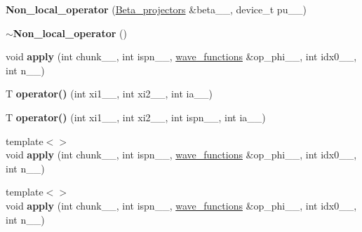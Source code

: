 \begin{DoxyCompactItemize}
\item 
\hypertarget{classsirius_1_1_non__local__operator_a67d6017cacb1ae150bb4e6275829b378}{}{\bfseries Non\+\_\+local\+\_\+operator} (\hyperlink{classsirius_1_1_beta__projectors}{Beta\+\_\+projectors} \&beta\+\_\+\+\_\+, device\+\_\+t pu\+\_\+\+\_\+)\label{classsirius_1_1_non__local__operator_a67d6017cacb1ae150bb4e6275829b378}

\item 
\hypertarget{classsirius_1_1_non__local__operator_a5475aa73a463143ff8c5e8a3ef864924}{}{\bfseries $\sim$\+Non\+\_\+local\+\_\+operator} ()\label{classsirius_1_1_non__local__operator_a5475aa73a463143ff8c5e8a3ef864924}

\item 
\hypertarget{classsirius_1_1_non__local__operator_a64d7b05b71fd42d0689b126756728286}{}void {\bfseries apply} (int chunk\+\_\+\+\_\+, int ispn\+\_\+\+\_\+, \hyperlink{classsddk_1_1wave__functions}{wave\+\_\+functions} \&op\+\_\+phi\+\_\+\+\_\+, int idx0\+\_\+\+\_\+, int n\+\_\+\+\_\+)\label{classsirius_1_1_non__local__operator_a64d7b05b71fd42d0689b126756728286}

\item 
\hypertarget{classsirius_1_1_non__local__operator_ae85701c110c359b68b4e61d92bad84cf}{}T {\bfseries operator()} (int xi1\+\_\+\+\_\+, int xi2\+\_\+\+\_\+, int ia\+\_\+\+\_\+)\label{classsirius_1_1_non__local__operator_ae85701c110c359b68b4e61d92bad84cf}

\item 
\hypertarget{classsirius_1_1_non__local__operator_aa13bdd2e55d9b6d27987be5a1b09b526}{}T {\bfseries operator()} (int xi1\+\_\+\+\_\+, int xi2\+\_\+\+\_\+, int ispn\+\_\+\+\_\+, int ia\+\_\+\+\_\+)\label{classsirius_1_1_non__local__operator_aa13bdd2e55d9b6d27987be5a1b09b526}

\item 
\hypertarget{classsirius_1_1_non__local__operator_a0ea18f9c6d4ecb3c559cabf6647b4c71}{}{\footnotesize template$<$$>$ }\\void {\bfseries apply} (int chunk\+\_\+\+\_\+, int ispn\+\_\+\+\_\+, \hyperlink{classsddk_1_1wave__functions}{wave\+\_\+functions} \&op\+\_\+phi\+\_\+\+\_\+, int idx0\+\_\+\+\_\+, int n\+\_\+\+\_\+)\label{classsirius_1_1_non__local__operator_a0ea18f9c6d4ecb3c559cabf6647b4c71}

\item 
\hypertarget{classsirius_1_1_non__local__operator_a12c30a6ff266d5dabe85c5b3fd44c7fa}{}{\footnotesize template$<$$>$ }\\void {\bfseries apply} (int chunk\+\_\+\+\_\+, int ispn\+\_\+\+\_\+, \hyperlink{classsddk_1_1wave__functions}{wave\+\_\+functions} \&op\+\_\+phi\+\_\+\+\_\+, int idx0\+\_\+\+\_\+, int n\+\_\+\+\_\+)\label{classsirius_1_1_non__local__operator_a12c30a6ff266d5dabe85c5b3fd44c7fa}

\end{DoxyCompactItemize}
